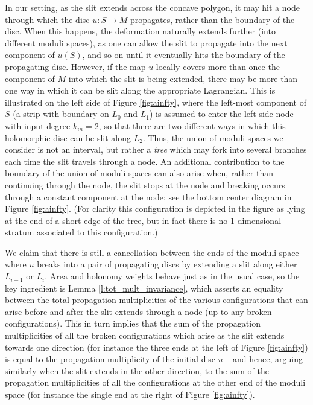 \documentclass[11pt,leqno]{amsart}
\numberwithin{equation}{section}
\begin{document}
In our setting, as the slit extends across the concave polygon, 
it may hit a node through which the disc $u:S\to M$ propagates,
rather than the boundary of the disc.  When this happens, the
deformation naturally extends further (into different moduli spaces), as one can allow the slit to
propagate
into the next component of $u(S)$, and so on until it eventually hits the
boundary of the propagating disc. However, if the map $u$ locally covers more than once
the component of $M$ into which the slit is being extended,
there may be more than one way in which it can be slit along the
appropriate Lagrangian. This is illustrated on the left side of
Figure \ref{fig:ainfty}, where the left-most component of $S$ (a strip with
boundary on $L_0$ and $L_1$) is assumed to enter the left-side node with input degree $k_{in}=2$, 
so that there are two different ways in which this holomorphic disc can be
slit along $L_2$. 
Thus, the union of moduli spaces we consider is not an interval,
but rather a {\em tree} which may fork into several branches each
time the slit travels through a node.
An additional contribution to the boundary of the union of moduli spaces
can also arise when, rather than continuing through the node, the
slit stops at the node and breaking occurs through a constant component at
the node; see the bottom center diagram in Figure \ref{fig:ainfty}. (For
clarity this configuration is depicted in the figure as lying at the end of 
a short edge of the tree, but in fact there is no 1-dimensional stratum 
associated to this configuration.)

We claim that there is still a cancellation between the ends of the moduli space 
where $u$ breaks into a pair of propagating discs by extending a slit along either $L_{i-1}$ or
$L_i$. Area and holonomy weights behave just as in the usual case, so the key
ingredient is Lemma \ref{l:tot_mult_invariance}, which asserts an equality
between the total propagation multiplicities of the various configurations
that can arise before and after the slit extends through a node (up to any
broken configurations).  This in turn implies that
the sum of the propagation multiplicities of all the broken configurations
which arise as the slit extends towards one direction (for instance the three ends at the left of
Figure \ref{fig:ainfty}) is equal to the propagation multiplicity of the
initial disc $u$ -- and hence, arguing similarly when
the slit extends in the other direction, to the sum of the propagation multiplicities
of all the configurations at the other end of the moduli space (for instance
the single end at the right of Figure \ref{fig:ainfty}).
\end{document}
